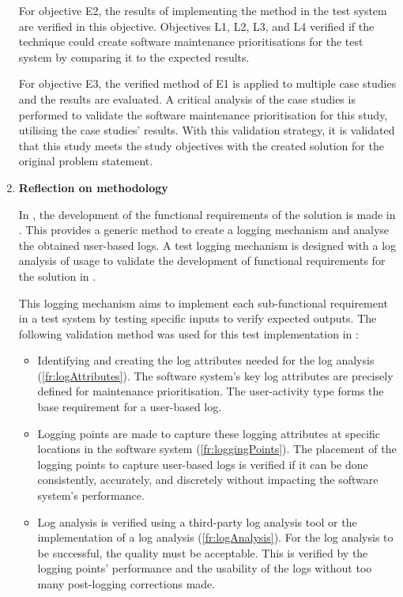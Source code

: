 \begin{enumerate}[label=\textbf{\Roman*.}]
	For objective E2, the results of implementing the method in the test system are verified in this objective. Objectives L1, L2, L3, and L4 verified if the technique could create software maintenance prioritisations for the test system by comparing it to the expected results. \par For objective E3, the verified method of E1 is applied to multiple case studies and the results are evaluated. A critical analysis of the case studies is performed to validate the software maintenance prioritisation for this study, utilising the case studies' results. With this validation strategy, it is validated that this study meets the study objectives with the created solution for the original problem statement.

\item \textbf{Reflection on methodology} \par In , the development of the functional requirements of the solution is made in . This provides a generic method to create a logging mechanism and analyse the obtained user-based logs. A test logging mechanism is designed with a log analysis of usage to validate the development of functional requirements for the solution in . \par This logging mechanism aims to implement each sub-functional requirement in a test system by testing specific inputs to verify expected outputs. The following validation method was used for this test implementation in :
	\begin{itemize}
		\item Identifying and creating the log attributes needed for the log analysis (\ref{fr:logAttributes}). The software system's key log attributes are precisely defined for maintenance prioritisation. The user-activity type forms the base requirement for a user-based log.
		
		\item Logging points are made to capture these logging attributes at specific locations in the software system (\ref{fr:loggingPoints}). The placement of the logging points to capture user-based logs is verified if it can be done consistently, accurately, and discretely without impacting the software system's performance. 
		
		\item Log analysis is verified using a third-party log analysis tool or the implementation of a log analysis (\ref{fr:logAnalysis}). For the log analysis to be successful, the quality must be acceptable. This is verified by the logging points' performance and the usability of the logs without too many post-logging corrections made.
		

\end{itemize}
\end{enumerate}
